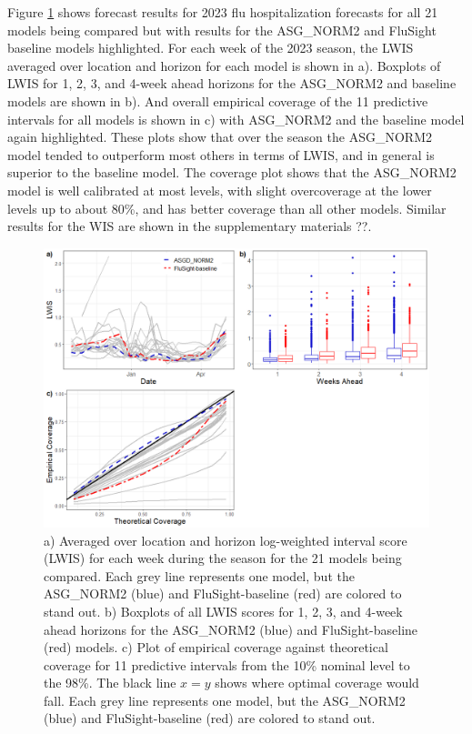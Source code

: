 Figure \ref{fig:lwis_cover_sum} shows forecast results for 2023 flu 
hospitalization forecasts for all 21 models being compared but with results
for the ASG\_NORM2 and FluSight baseline models highlighted. 
For each week of the 2023 season, the  
LWIS averaged over location and horizon 
for each model is shown in a). Boxplots of LWIS for 1, 2, 3, and 4-week ahead
horizons for the ASG\_NORM2 and baseline models are shown in b). And 
overall empirical coverage of the 11 predictive intervals for all models is 
shown in c) with ASG\_NORM2 and the baseline model again highlighted. 
These plots show that over the season the ASG\_NORM2 model tended to 
outperform most others in terms of LWIS, and in general is superior to the 
baseline model. The coverage plot shows that the ASG\_NORM2 model is well 
calibrated at most levels, with slight overcoverage at the lower levels
up to about 80\%, and has better coverage than all other models. Similar results
for the WIS are shown in the supplementary materials ??.






\begin{figure}[hbt!]
    
    \includegraphics[scale = .6]{Images/lwis_cover_sum.png}
    \caption{a) Averaged over location and horizon log-weighted interval score
    (LWIS) for each week during the season for the 21 models being compared. 
    Each grey line represents one model, but the ASG\_NORM2 (blue) and 
    FluSight-baseline (red) are colored to stand out.
    b) Boxplots of all LWIS scores for 1, 2, 3, and 4-week ahead horizons 
    for the ASG\_NORM2 (blue) and FluSight-baseline (red) models.
    c) Plot of empirical coverage against theoretical coverage for 11 
    predictive intervals from the 10\% nominal level to the 98\%. The black
    line $x = y$ shows where optimal coverage would fall.
    Each grey line represents one model, but the ASG\_NORM2 (blue) and 
    FluSight-baseline (red) are colored to stand out.}
    \label{fig:lwis_cover_sum}
\end{figure}


